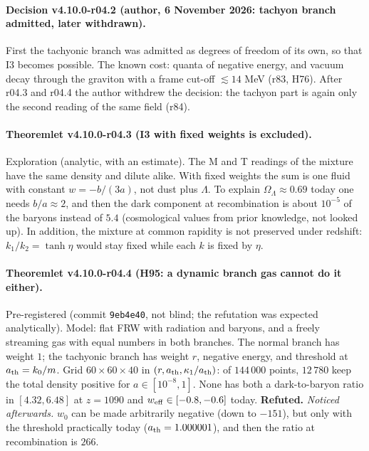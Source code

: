 \paragraph{Decision v4.10.0-r04.2 (author, 6 November 2026: tachyon branch admitted, later withdrawn).}
First the tachyonic branch was admitted as degrees of freedom of its own, so that I3 becomes possible.  The known cost: quanta of negative energy, and
vacuum decay through the graviton with a frame cut-off \(\lesssim14\) MeV (r83, H76).  After r04.3 and r04.4 the author withdrew the decision: the
tachyon part is again only the second reading of the same field (r84).

\paragraph{Theoremlet v4.10.0-r04.3 (I3 with fixed weights is excluded).}
Exploration (analytic, with an estimate).  The M and T readings of the mixture have the same density and dilute alike.  With fixed weights the sum is
one fluid with constant \(w=-b/(3a)\), not dust plus \(\Lambda\).  To explain \(\Omega_\Lambda\approx0.69\) today one needs \(b/a\approx2\), and then the dark
component at recombination is about \(10^{-5}\) of the baryons instead of \(5.4\) (cosmological values from prior knowledge, not looked up).  In
addition, the mixture at common rapidity is not preserved under redshift: \(k_1/k_2=\tanh\eta\) would stay fixed while each \(k\) is fixed by \(\eta\).

\paragraph{Theoremlet v4.10.0-r04.4 (H95: a dynamic branch gas cannot do it either).}
Pre-registered (commit \texttt{9eb4e40}, not blind; the refutation was expected analytically).  Model: flat FRW with radiation and baryons, and a
freely streaming gas with equal numbers in both branches.  The normal branch has weight \(1\); the tachyonic branch has weight \(r\), negative
energy, and threshold at \(a_{\rm th}=k_0/m\).  Grid \(60\times60\times40\) in \((r,a_{\rm th},\kappa_1/a_{\rm th})\): of \(144\,000\) points, \(12\,780\) keep
the total density positive for \(a\in[10^{-8},1]\).  None has both a dark-to-baryon ratio in \([4.32,6.48]\) at \(z=1090\) and \(w_{\rm eff}\in[-0.8,-0.6]\)
today.  \textbf{Refuted.}
\emph{Noticed afterwards.}  \(w_0\) can be made arbitrarily negative (down to \(-151\)), but only with the threshold practically today
(\(a_{\rm th}=1.000001\)), and then the ratio at recombination is \(266\).

